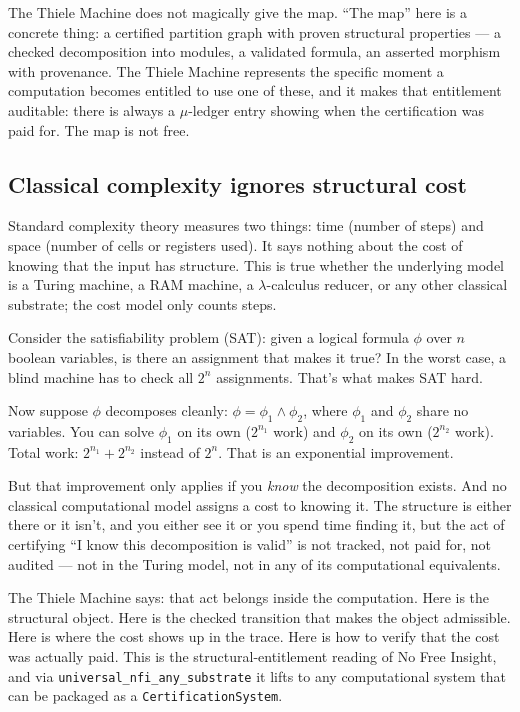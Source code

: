 \documentclass[11pt,a4paper]{article}
\theoremstyle{plain}
\theoremstyle{definition}
\theoremstyle{remark}
\begin{document}
The Thiele Machine does not magically give the map. ``The map'' here is a concrete thing: a certified partition graph with proven structural properties --- a checked decomposition into modules, a validated formula, an asserted morphism with provenance. The Thiele Machine represents the specific moment a computation becomes entitled to use one of these, and it makes that entitlement auditable: there is always a $\mu$-ledger entry showing when the certification was paid for. The map is not free.

\subsection{Classical complexity ignores structural cost}

Standard complexity theory measures two things: time (number of steps) and space (number of cells or registers used). It says nothing about the cost of knowing that the input has structure. This is true whether the underlying model is a Turing machine, a RAM machine, a $\lambda$-calculus reducer, or any other classical substrate; the cost model only counts steps.

Consider the satisfiability problem (SAT): given a logical formula $\phi$ over $n$ boolean variables, is there an assignment that makes it true? In the worst case, a blind machine has to check all $2^n$ assignments. That's what makes SAT hard.

Now suppose $\phi$ decomposes cleanly: $\phi = \phi_1 \land \phi_2$, where $\phi_1$ and $\phi_2$ share no variables. You can solve $\phi_1$ on its own ($2^{n_1}$ work) and $\phi_2$ on its own ($2^{n_2}$ work). Total work: $2^{n_1} + 2^{n_2}$ instead of $2^n$. That is an exponential improvement.

But that improvement only applies if you \emph{know} the decomposition exists. And no classical computational model assigns a cost to knowing it. The structure is either there or it isn't, and you either see it or you spend time finding it, but the act of certifying ``I know this decomposition is valid'' is not tracked, not paid for, not audited --- not in the Turing model, not in any of its computational equivalents.

The Thiele Machine says: that act belongs inside the computation. Here is the structural object. Here is the checked transition that makes the object admissible. Here is where the cost shows up in the trace. Here is how to verify that the cost was actually paid. This is the structural-entitlement reading of No Free Insight, and via \texttt{universal\_nfi\_any\_substrate} it lifts to any computational system that can be packaged as a \texttt{CertificationSystem}.
\end{document}
